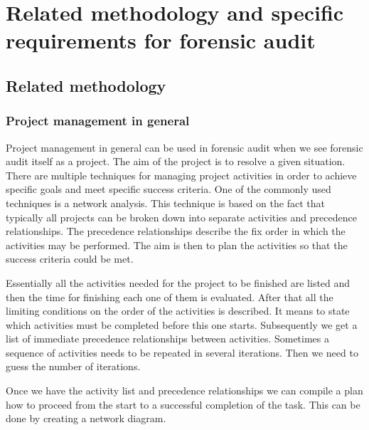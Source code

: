 \chapter{Related methodology and specific requirements for forensic audit}


\section{Related methodology}
\subsection{Project management in general}

Project management in general can be used in forensic audit when we see forensic audit itself as a project. The aim of the project is to resolve a given situation. 
There are multiple techniques for managing project activities in order to achieve specific goals and meet specific success criteria. One of the commonly used techniques is a network analysis. This technique is based on the fact that typically all projects can be broken down into separate activities and precedence relationships.  The precedence relationships describe the fix order in which the activities may be performed. The aim is then to plan the activities so that the success criteria could be met. 

Essentially all the activities needed for the project to be finished are listed and then the time for finishing each one of them is evaluated. After that all the limiting conditions on the order of the activities is described. It means to state which activities must be completed before this one starts. Subsequently we get a list of immediate precedence relationships between activities. Sometimes a sequence of activities needs to be repeated in several iterations. Then we need to guess  the number of iterations.

Once we have the activity list and precedence relationships we can compile a plan how to proceed from the start to a successful completion of the task. This can be done by creating a network diagram. 


\sediva{\blindtext}

